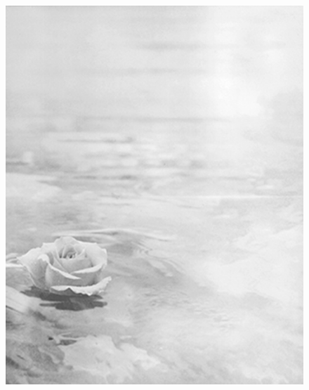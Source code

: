 \documentclass[ngerman,a4paper,11pt]{scrreprt}
\begin{document}
\begin{figure}[H]
\centering
\includegraphics[width=\textwidth,height=.8\textheight]{Bilder/Bilder/./750_0010_12458_Seerose_test.png}
\end{figure}
\end{document}

